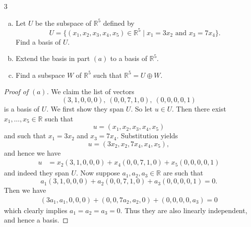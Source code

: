 \documentclass[11pt]{extarticle}
\newenvironment{problem}[1]{\begin{prob*}{#1}{}}{\end{prob*}}
\newcommand{\R}{\mathbb{R}}
\begin{document}
\begin{problem}{3}
\begin{enumerate}[(a)]
\item Let $U$ be the subspace of $\R^5$ defined by
\begin{equation*}
U = \{(x_1,x_2,x_3,x_4,x_5)\in \R^5\mid x_1=3x_2\text{ and }x_3= 7x_4\}.
\end{equation*}
Find a basis of $U$.
\item Extend the basis in part $(a)$ to a basis of $\R^5$.
\item Find a subspace $W$ of $\R^5$ such that $\R^5=U\oplus W$.
\end{enumerate}
\end{problem}
\begin{proof}[Proof of $(a)$]
We claim the list of vectors
\begin{equation*}
(3, 1, 0, 0, 0), ~ (0, 0, 7, 1, 0), ~ (0, 0, 0, 0, 1)
\end{equation*}
is a basis of $U$.  We first show they span $U$.  So let $u\in U$.  Then there exist $x_1,\dots,x_5\in\R$ such that
\begin{equation*}
u = (x_1, x_2, x_3, x_4, x_5)
\end{equation*}
and such that $x_1=3x_2$ and $x_3 = 7x_4$.  Substitution yields
\begin{equation*}
u = (3x_2, x_2, 7x_4, x_4, x_5),
\end{equation*}
and hence we have
\begin{align*}
u &= x_2(3, 1, 0, 0, 0) + x_4(0, 0, 7, 1, 0) + x_5 (0, 0, 0, 0, 1)
\end{align*}
and indeed they span $U$.  Now suppose $a_1, a_2, a_3\in\R$ are such that 
\begin{equation*}
a_1(3, 1, 0, 0, 0) + a_2(0, 0, 7, 1, 0) + a_3(0, 0, 0, 0, 1) = 0.
\end{equation*}
Then we have
\begin{align*}
(3a_1, a_1, 0, 0, 0) + (0, 0, 7a_2, a_2, 0) + (0, 0, 0, 0, a_3) = 0
\end{align*}
which clearly implies $a_1=a_2=a_3 =0$.  Thus they are also linearly independent, and hence a basis.
\end{proof}
\end{document}
